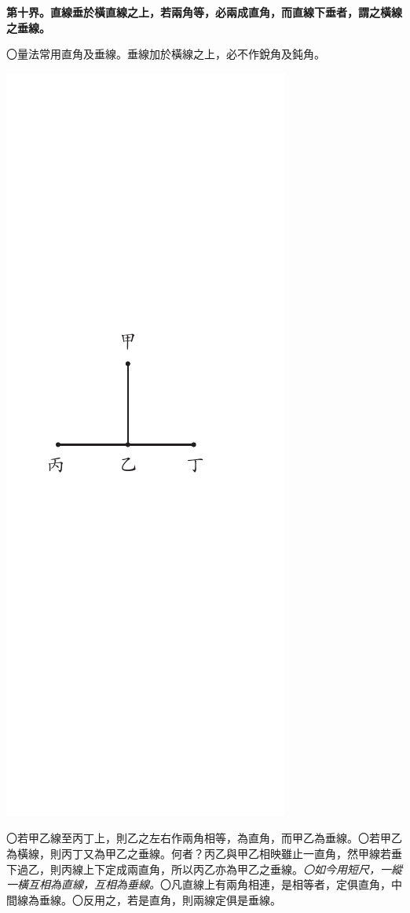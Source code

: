 \documentclass[12pt,b5paper,landscape]{article}
\newcommand{\ccom}[1]{{\footnotesize \emph{〇#1}}}
\newcommand{\bcom}[1]{〇#1}
\newcommand{\cthm}[1]{{
\vspace{8pt}

\bfseries #1}}
\begin{document}
\begin{multicols}{2}
\cthm{第十界。直線垂於橫直線之上，若兩角等，必兩成直角，而直線下垂者，謂之橫線之垂線。}\bcom{量法常用直角及垂線。垂線加於橫線之上，必不作銳角及鈍角。}
\begin{center}
\includegraphics[angle=90]{eu10}
\end{center}
\bcom{若甲乙線至丙丁上，則乙之左右作兩角相等，為直角，而甲乙為垂線。}\bcom{若甲乙為橫線，則丙丁又為甲乙之垂線。何者？丙乙與甲乙相映雖止一直角，然甲線若垂下過乙，則丙線上下定成兩直角，所以丙乙亦為甲乙之垂線。}\ccom{如今用短尺，一縱一橫互相為直線，互相為垂線。}\bcom{凡直線上有兩角相連，是相等者，定俱直角，中間線為垂線。}\bcom{反用之，若是直角，則兩線定俱是垂線。}


\end{multicols}
\end{document}

